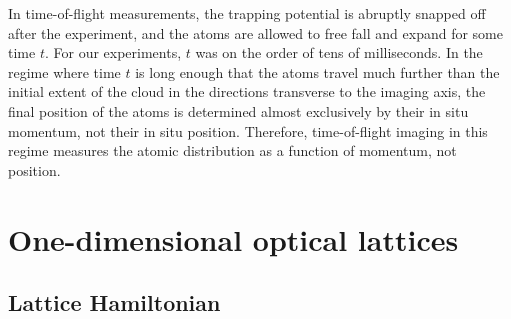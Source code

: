 In time-of-flight measurements, the trapping potential is abruptly snapped off after the experiment, and the atoms are allowed to free fall and expand for some time $t$. For our experiments, $t$ was on the order of tens of milliseconds. In the regime where time $t$ is long enough that the atoms travel much further than the initial extent of the cloud in the directions transverse to the imaging axis, the final position of the atoms is determined almost exclusively by their in situ momentum, not their in situ position. Therefore, time-of-flight imaging in this regime measures the atomic distribution as a function of momentum, not position.  

\section{One-dimensional optical lattices}\label{sec:1Dlattice}

\subsection{Lattice Hamiltonian}

